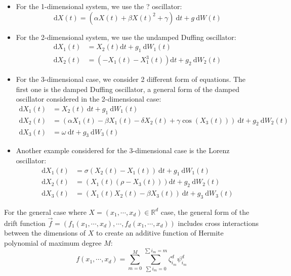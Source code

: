 \documentclass{article}
\begin{document}
\begin{itemize}
\item For the 1-dimensional system, we use the ? oscillator:
\begin{equation}
\mathrm{d}X(t) = (\alpha X(t) + \beta X(t)^2 + \gamma) \: \mathrm{d}t + g \: \mathrm{d}W(t)
\end{equation}
\item For the 2-dimensional system, we use the undamped Duffing oscillator:
\begin{align*}
\mathrm{d}X_1(t) & = X_2(t) \mathrm{d}t + g_1 \: \mathrm{d} W_1(t) \\
\mathrm{d}X_2(t) & = (-X_1(t) - X^3_1(t)) \mathrm{d}t + g_2 \: \mathrm{d} W_2(t)
\end{align*}
\item For the 3-dimensional case, we consider 2 different form of equations. The first one is the damped Duffing oscillator, a general form of the damped oscillator considered in the 2-dimensional case:
\begin{align*}
\mathrm{d}X_1(t) & = X_2(t) \: \mathrm{d}t + g_1 \: \mathrm{d}W_1(t) \\
\mathrm{d}X_2(t) & = (\alpha X_1(t) - \beta X_1(t) - \delta X_2(t) + \gamma \cos (X_3(t))) \: \mathrm{d}t + g_2 \: \mathrm{d}W_2(t) \\
\mathrm{d}X_3(t) & = \omega \: \mathrm{d}t + g_3 \: \mathrm{d}W_3(t)
\end{align*}
\item Another example considered for the 3-dimensional case is the Lorenz oscillator:
\begin{align*}
\mathrm{d}X_1(t) & = \sigma (X_2(t) - X_1(t)) \: \mathrm{d}t + g_1 \: \mathrm{d}W_1(t) \\
\mathrm{d}X_2(t) & = (X_1(t) (\rho - X_3(t))) \mathrm{d}t + g_2 \: \mathrm{d}W_2(t) \\
\mathrm{d}X_3(t) & = (X_1(t) X_2(t) - \beta X_3(t)) \: \mathrm{d}t + g_3 \: \mathrm{d}W_3(t)
\end{align*}
\end{itemize}
For the general case where $X = (x_1, \cdots, x_d) \in \mathbb{R}^d$ case, the general form of the drift function $\vec{f} = (f_1(x_1, \cdots, x_d), \cdots, f_d(x_1, \cdots, x_d))$ includes cross interactions between the dimensions of $X$ to create an additive function of Hermite polynomial of maximum degree $M$:
\begin{equation}
f(x_1, \cdots, x_d) = \sum_{m = 0}^{M} \sum_{\sum i_m = 0}^{\sum i_m = m} \zeta_{i_m}^d \psi_{i_m}^d 
\end{equation}
\end{document}
